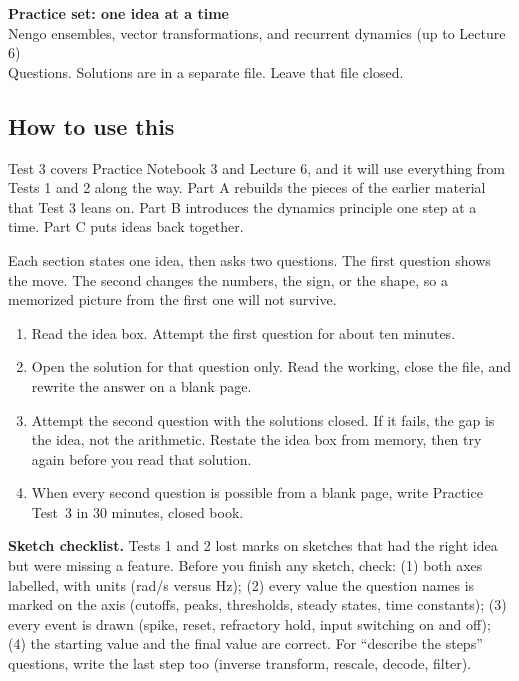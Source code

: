 \documentclass[11pt,letterpaper]{article}
\begin{document}
\begin{center}
{\Large\bfseries Practice set: one idea at a time}\\[2pt]
{\large Nengo ensembles, vector transformations, and recurrent dynamics (up to Lecture 6)}\\[4pt]
{\normalsize Questions. Solutions are in a separate file. Leave that file closed.}
\end{center}

\subsection*{How to use this}

Test 3 covers Practice Notebook 3 and Lecture 6, and it will use everything from Tests 1 and 2 along the way. Part A rebuilds the pieces of the earlier material that Test 3 leans on. Part B introduces the dynamics principle one step at a time. Part C puts ideas back together.

Each section states one idea, then asks two questions. The first question shows the move. The second changes the numbers, the sign, or the shape, so a memorized picture from the first one will not survive.

\begin{enumerate}[leftmargin=1.4em]
\item Read the idea box. Attempt the first question for about ten minutes.
\item Open the solution for that question only. Read the working, close the file, and rewrite the answer on a blank page.
\item Attempt the second question with the solutions closed. If it fails, the gap is the idea, not the arithmetic. Restate the idea box from memory, then try again before you read that solution.
\item When every second question is possible from a blank page, write Practice Test~3 in 30 minutes, closed book.
\end{enumerate}

\begin{trythis}
\textbf{Sketch checklist.} Tests 1 and 2 lost marks on sketches that had the right idea but were missing a feature. Before you finish any sketch, check:
(1) both axes labelled, with units (rad/s versus Hz);
(2) every value the question names is marked on the axis (cutoffs, peaks, thresholds, steady states, time constants);
(3) every event is drawn (spike, reset, refractory hold, input switching on and off);
(4) the starting value and the final value are correct.
For ``describe the steps'' questions, write the last step too (inverse transform, rescale, decode, filter).
\end{trythis}
\end{document}
